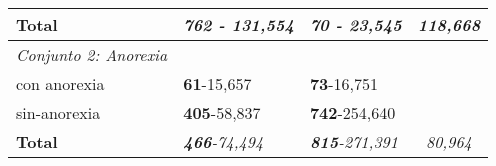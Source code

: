 \begin{table}[!hbt]
{\begin{tabular}{llll}
\rowcolor[HTML]{FFFFFF} 
\textbf{Total}                      & \textit{\textbf{762} - 131,554}                       & \textit{\textbf{70} - 23,545}                         & \multicolumn{1}{c}{\cellcolor[HTML]{FFFFFF}\textit{118,668}}    \\ \hline
\rowcolor[HTML]{EFEFEF} 
\textit{Conjunto 2: Anorexia}       & \multicolumn{1}{c}{\cellcolor[HTML]{EFEFEF}} & \multicolumn{1}{c}{\cellcolor[HTML]{EFEFEF}} &                                                              \\ \hline
\rowcolor[HTML]{FFFFFF} 
con anorexia                        & \textbf{61}-15,657                                    & \textbf{73}-16,751                                    &                                                              \\ \hline
\rowcolor[HTML]{FFFFFF} 
sin-anorexia                        & \textbf{405}-58,837                                  & \textbf{742}-254,640                                  &                                                              \\ \hline
\rowcolor[HTML]{FFFFFF} 
\textbf{Total}                      & \textit{\textbf{466}-{74,494}}                         & \textit{\textbf{815}-271,391}                         & \multicolumn{1}{c}{\cellcolor[HTML]{FFFFFF}\textit{80,964
}} \\ \hline
\end{tabular}

}

\end{table}
